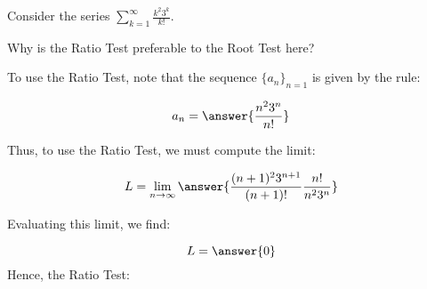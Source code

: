 \documentclass{ximera}
\author{Jim Talamo}
\begin{document}
\begin{exercise}
Consider the series $\sum_{k=1}^{\infty} \frac{k^2 3^k}{k!}$.

\begin{multipleChoice}
\end{multipleChoice}

Why is the Ratio Test preferable to the Root Test here?
\begin{multipleChoice}
\end{multipleChoice}

To use the Ratio Test, note that the sequence $\{a_n\}_{n=1}$ is given by the rule:

\[
a_n = \answer{\frac{n^2 3^n}{n!}}
\]

Thus, to use the Ratio Test, we must compute the limit:

\[
L = \lim_{n \to \infty} \answer{\frac{(n+1)^2 3^{n+1}}{(n+1)!}\frac{n!}{n^2 3^n}}
\]

Evaluating this limit, we find:

\[
L = \answer{0}
\]
Hence, the Ratio Test:
\begin{multipleChoice}
\end{multipleChoice}

\end{exercise}
\end{document}

